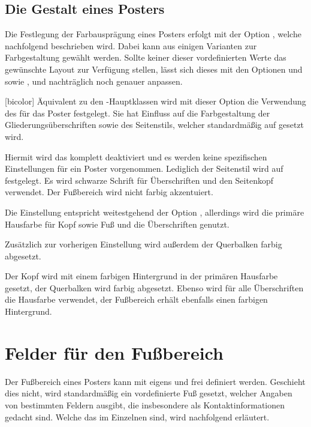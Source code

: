 \begin{Bundle*}[v2.05]{}
\subsection{Die Gestalt eines Posters}

Die Festlegung der Farbausprägung eines Posters erfolgt mit der Option 
, welche nachfolgend beschrieben wird. Dabei kann aus einigen 
Varianten zur Farbgestaltung gewählt werden. Sollte keiner dieser 
vordefinierten Werte das gewünschte Layout zur Verfügung stellen, lässt sich 
dieses mit den Optionen  und  sowie 
,  und  nachträglich 
noch genauer anpassen.


\begin{Declaration}{}[bicolor]
\printdeclarationlist%
%
Äquivalent zu den \TUDScript-Hauptklassen wird mit dieser Option die Verwendung 
des \TUDCDs für das Poster festgelegt. Sie hat Einfluss auf die Farbgestaltung 
der Gliederungsüberschriften sowie des Seitenstils, welcher standardmäßig auf 
 gesetzt wird.
%
\begin{values}{}
\itemfalse
  Hiermit wird das \CD komplett deaktiviert und es werden keine spezifischen 
  Einstellungen für ein Poster vorgenommen. Lediglich der Seitenstil wird auf 
   festgelegt.
  Es wird schwarze Schrift für Überschriften und den Seitenkopf verwendet. Der 
  Fußbereich wird nicht farbig akzentuiert.
\item[lightcolor/pale]
  Die Einstellung entspricht weitestgehend der Option , 
  allerdings wird die primäre Hausfarbe  für Kopf sowie Fuß und 
  die Überschriften genutzt.
\item[barcolor]
  Zusätzlich zur vorherigen Einstellung wird außerdem der Querbalken farbig 
  abgesetzt.
\item[bicolor/color/fullcolor]
  Der Kopf wird mit einem farbigen Hintergrund in der primären Hausfarbe 
   gesetzt, der Querbalken wird farbig abgesetzt. Ebenso wird für 
  alle Überschriften die Hausfarbe verwendet, der Fußbereich erhält ebenfalls 
  einen farbigen Hintergrund.
\end{values}
\end{Declaration}






\section{Felder für den Fußbereich}
%
%
Der Fußbereich eines Posters kann mit  eigens und frei 
definiert werden. Geschieht dies nicht, wird standardmäßig ein vordefinierte 
Fuß gesetzt, welcher Angaben von bestimmten Feldern ausgibt, die insbesondere 
als Kontaktinformationen gedacht sind. Welche das im Einzelnen sind, wird 
nachfolgend erläutert.


\end{Bundle*}
